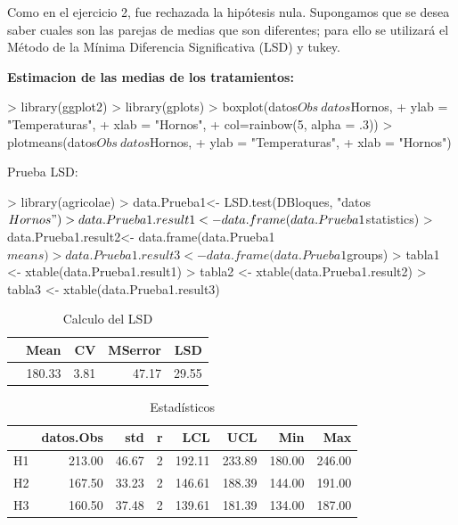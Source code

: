 \documentclass[12pt,letterpaper]{report}
\begin{document}
Como en el ejercicio 2, fue rechazada la hipótesis nula. Supongamos que se desea
saber cuales son las parejas de medias que son diferentes; para ello se utilizará el Método de la
Mínima Diferencia Significativa (LSD) y tukey.

\textbf{Estimacion de las medias de los tratamientos:}
\begin{Schunk}
\begin{Sinput}
> library(ggplot2)
> library(gplots)
> boxplot(datos$Obs~datos$Hornos,
+         ylab = "Temperaturas",
+         xlab = "Hornos",
+         col=rainbow(5, alpha = .3))
> plotmeans(datos$Obs~datos$Hornos,
+           ylab = "Temperaturas",
+           xlab = "Hornos")
\end{Sinput}
\end{Schunk}

Prueba LSD:
\begin{Schunk}
\begin{Sinput}
> library(agricolae)
> data.Prueba1<- LSD.test(DBloques, "datos$Hornos")
> data.Prueba1.result1<- data.frame(data.Prueba1$statistics)
> data.Prueba1.result2<- data.frame(data.Prueba1$means)
> data.Prueba1.result3<- data.frame(data.Prueba1$groups)
> tabla1 <- xtable(data.Prueba1.result1)
> tabla2 <- xtable(data.Prueba1.result2)
> tabla3 <- xtable(data.Prueba1.result3)
\end{Sinput}
\end{Schunk}
\newpage
\begin{table}[ht]
\centering
\begin{tabular}{rrrrr}
  \hline
 & Mean & CV & MSerror & LSD \\ 
  \hline
  & 180.33 & 3.81 & 47.17 & 29.55 \\ 
   \hline
\end{tabular}
\caption{Calculo del LSD}
\end{table}

\begin{table}[ht]
\centering
\begin{tabular}{rrrrrrrr}
  \hline
 & datos.Obs & std & r & LCL & UCL & Min & Max \\ 
  \hline
H1 & 213.00 & 46.67 &   2 & 192.11 & 233.89 & 180.00 & 246.00 \\ 
  H2 & 167.50 & 33.23 &   2 & 146.61 & 188.39 & 144.00 & 191.00 \\ 
  H3 & 160.50 & 37.48 &   2 & 139.61 & 181.39 & 134.00 & 187.00 \\ 
   \hline
\end{tabular}
\caption{Estadísticos}
\end{table}
\end{document}
